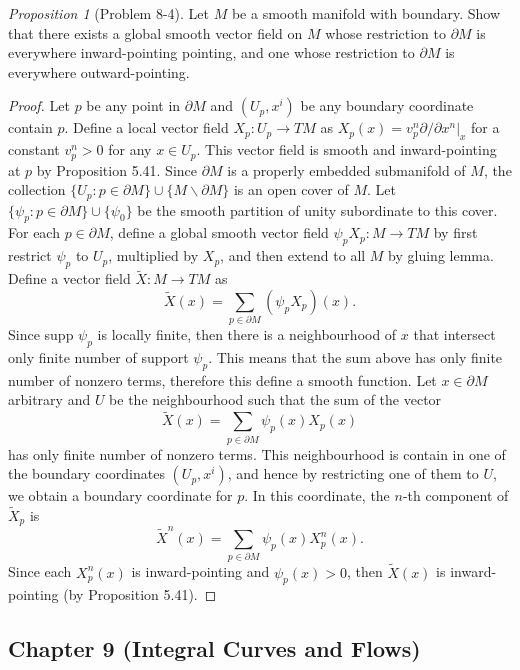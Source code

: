 \documentclass[a4paper]{article}
\theoremstyle{remark}
\newtheorem{prop}{Proposition}
\newcommand{\doo}{\partial}    %
\newcommand\wtilde[1]{\widetilde{#1}} %
\begin{document}
\begin{prop}[Problem 8-4]
Let $M$ be a smooth manifold with boundary. Show that there exists a global smooth vector field on $M$ whose restriction to $\doo M$ is everywhere inward-pointing pointing, and one whose restriction to $\doo M$ is everywhere outward-pointing.
\end{prop}
\begin{proof}
Let $p$ be any point in $\doo M$ and $(U_p,x^i)$ be any boundary coordinate contain $p$. Define a local vector field $X_p : U_p \to TM$ as $X_p(x) = v^n_p \doo/\doo x^n|_x$ for a constant $v^n_p >0$ for any $x \in U_p$. This vector field is smooth and inward-pointing at $p$ by Proposition 5.41. Since $\doo M$ is a properly embedded submanifold of $M$, the collection $\{U_p : p \in \doo M\} \cup \{M \smallsetminus \doo M \}$ is an open cover of $M$. Let $\{\psi_p: p\in \doo M\} \cup \{\psi_0\}$ be the smooth partition of unity subordinate to this cover. For each $p \in \doo M$, define a global smooth vector field $\psi_p X_p : M \to TM$ by first restrict $\psi_p$ to $U_p$, multiplied by $X_p$, and then extend to all $M$ by gluing lemma. Define a vector field $\wtilde{X} : M \to TM$ as
$$
\wtilde{X}(x) = \sum_{p \in \doo M} (\psi_p X_p)(x). 
$$ 
Since supp $\psi_p$ is locally finite, then there is a neighbourhood of $x$ that intersect only finite number of support $\psi_p$. This means that the sum above has only finite number of nonzero terms, therefore this define a smooth function. Let $x \in \doo M$ arbitrary and $U$ be the neighbourhood such that the sum of the vector
$$
\wtilde{X}(x) = \sum_{p \in \doo M} \psi_p(x) X_p(x)
$$
has only finite number of nonzero terms. This neighbourhood is contain in one of the boundary coordinates $(U_p,x^i)$, and hence by restricting one of them to $U$, we obtain a boundary coordinate for $p$. In this coordinate, the $n$-th component of $\wtilde{X}_p$ is
$$
\wtilde{X}^n(x) = \sum_{p \in \doo M} \psi_p(x) X_p^n(x).
$$  
Since each $X_p^n(x)$ is inward-pointing and $\psi_p(x) >  0$, then $\wtilde{X}(x)$ is inward-pointing (by Proposition 5.41).
\end{proof}

\subsection{Chapter 9 (Integral Curves and Flows)}
\end{document}
